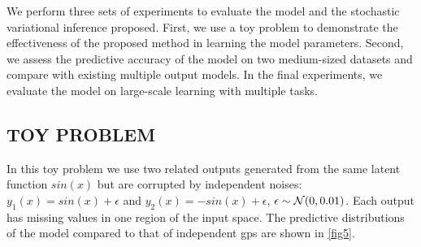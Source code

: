 We perform three sets of experiments to evaluate the model and the stochastic variational inference proposed. 
First, we use a toy problem to demonstrate the effectiveness of the proposed method in learning the model parameters.
Second, we assess the predictive accuracy of the model on two medium-sized datasets and compare with existing multiple output models.
In the final experiments, we evaluate the model on large-scale learning with multiple tasks.

\subsection{TOY PROBLEM}
In this toy problem we use two related outputs generated from the same latent function $sin(x)$ but are corrupted by independent noises: $y_1(x) = sin(x) + \epsilon$ and $y_2(x) = -sin(x) + \epsilon$, $\epsilon \sim \mathcal{N}(0,0.01)$.
Each output has missing values in one region of the input space.
The predictive distributions of the model compared to that of independent gps are shown in \ref{fig5}.

